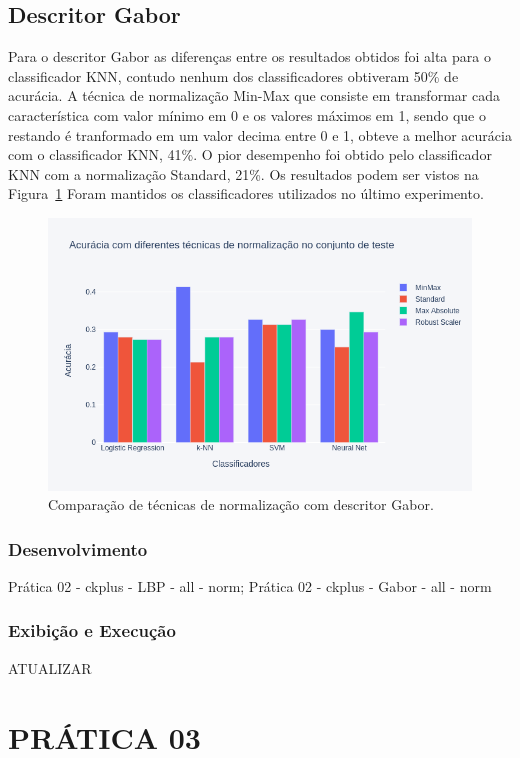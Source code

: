\documentclass[a4paper, 12 pt, conference]{ieeeconf}  %
\begin{document}
\subsection{Descritor Gabor}
Para o descritor Gabor as diferenças entre os resultados obtidos foi alta para o classificador KNN, contudo nenhum dos classificadores obtiveram 50\% de acurácia. A técnica de normalização Min-Max que consiste em transformar cada característica com valor mínimo em 0 e os valores máximos em 1, sendo que o restando é tranformado em um valor decima entre 0 e 1, obteve a melhor acurácia com o classificador KNN, 41\%. O pior desempenho foi obtido pelo classificador KNN com a normalização Standard, 21\%. Os resultados podem ser vistos na Figura~\ref{fig:bar_norm_all_gabor} Foram mantidos os classificadores utilizados no último experimento.

\begin{figure}[!htbp]
	\centering
	\includegraphics[width=1.0\linewidth,clip=true,trim=0cm 0cm 0cm 0cm, keepaspectratio=true]{bar_norm_all_gabor.png}
	\caption{Comparação de técnicas de normalização com descritor Gabor.}
	\label{fig:bar_norm_all_gabor}
\end{figure}

\subsubsection{Desenvolvimento} Prática 02 - ckplus  - LBP - all - norm; Prática 02 - ckplus  - Gabor - all - norm
\subsubsection{Exibição e Execução} ATUALIZAR

\section{PRÁTICA 03}
\label{pratica03}
\end{document}
